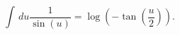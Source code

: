\begin{equation}
  \int \, du \frac{1}{\sin(u)}  = 
   \log\left(-\tan\left(\frac{u}{2}\right)\right).
\end{equation}

